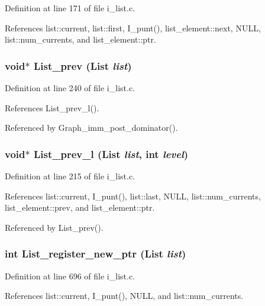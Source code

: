 Definition at line 171 of file i\_\-list.c.

References list::current, list::first, I\_\-punt(), list\_\-element::next, NULL, list::num\_\-currents, and list\_\-element::ptr.
\subsubsection{\setlength{\rightskip}{0pt plus 5cm}void$\ast$ List\_\-prev (\bf{List} {\em list})}\label{i__list_8c_f25e6bb2ba95de48946907f9f21c985b}




Definition at line 240 of file i\_\-list.c.

References List\_\-prev\_\-l().

Referenced by Graph\_\-imm\_\-post\_\-dominator().
\subsubsection{\setlength{\rightskip}{0pt plus 5cm}void$\ast$ List\_\-prev\_\-l (\bf{List} {\em list}, int {\em level})}\label{i__list_8c_547743b6d36084919515cc74574d6bc4}




Definition at line 215 of file i\_\-list.c.

References list::current, I\_\-punt(), list::last, NULL, list::num\_\-currents, list\_\-element::prev, and list\_\-element::ptr.

Referenced by List\_\-prev().
\subsubsection{\setlength{\rightskip}{0pt plus 5cm}int List\_\-register\_\-new\_\-ptr (\bf{List} {\em list})}\label{i__list_8c_556c032cdac7ab24bf31cef6364310ba}




Definition at line 696 of file i\_\-list.c.

References list::current, I\_\-punt(), NULL, and list::num\_\-currents.
